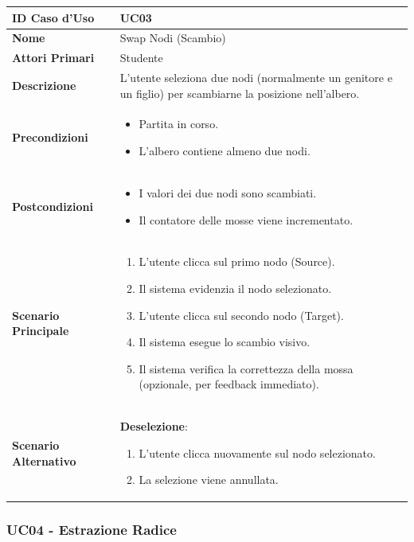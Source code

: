 \documentclass[openany]{theme/uniprthesis}
\begin{document}
\begin{xltabular}{\textwidth}{|l|X|}
\hline
\textbf{ID Caso d'Uso} & UC03 \\
\hline
\textbf{Nome} & Swap Nodi (Scambio) \\
\hline
\textbf{Attori Primari} & Studente \\
\hline
\textbf{Descrizione} & L'utente seleziona due nodi (normalmente un genitore e un figlio) per scambiarne la posizione nell'albero. \\
\hline
\textbf{Precondizioni} & \begin{itemize}
    \item Partita in corso.
    \item L'albero contiene almeno due nodi.
\end{itemize} \\
\hline
\textbf{Postcondizioni} & \begin{itemize}
    \item I valori dei due nodi sono scambiati.
    \item Il contatore delle mosse viene incrementato.
\end{itemize} \\
\hline
\textbf{Scenario Principale} & \begin{enumerate}
    \item L'utente clicca sul primo nodo (Source).
    \item Il sistema evidenzia il nodo selezionato.
    \item L'utente clicca sul secondo nodo (Target).
    \item Il sistema esegue lo scambio visivo.
    \item Il sistema verifica la correttezza della mossa (opzionale, per feedback immediato).
\end{enumerate} \\
\hline
\textbf{Scenario Alternativo} & \textbf{Deselezione}:
\begin{enumerate}
    \item L'utente clicca nuovamente sul nodo selezionato.
    \item La selezione viene annullata.
\end{enumerate} \\
\hline
\end{xltabular}

\subsubsection{UC04 - Estrazione Radice}
\end{document}
